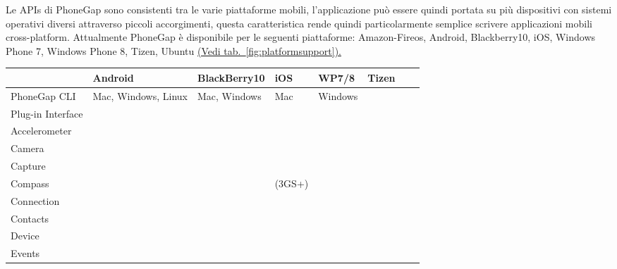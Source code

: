             Le APIs di PhoneGap sono consistenti tra le varie piattaforme mobili,
            l'applicazione può essere quindi portata su più dispositivi con
            sistemi operativi diversi attraverso piccoli accorgimenti, questa
            caratteristica rende quindi particolarmente semplice scrivere
            applicazioni mobili cross-platform.
            Attualmente PhoneGap è disponibile per le seguenti piattaforme:
            Amazon-Fireos, Android, Blackberry10, iOS, Windows Phone 7,
            Windows Phone 8, Tizen, Ubuntu \hyperref[fig:platformsupport]{(Vedi
            tab.~\ref{fig:platformsupport}).}
            {\footnotesize
                \begin{table}
                    \begin{tabularx}{\textwidth}{|l*{7}{|s}|}
                        \hline
                          & Android & Black\-Berry10 & iOS & WP7/8
                        & Tizen
                        \tabularnewline
                        \hline
                        PhoneGap CLI &\sprt{} Mac, Windows, Linux &
                        \sprt{} Mac, Windows & \sprt{} Mac & \sprt{} Windows & \notsprt{}
                        \tabularnewline
                        \hline
                        Plug-in Interface & \sprt{} & \sprt{} & \sprt{} & \sprt{} &
                        \notsprt{}
                        \tabularnewline
                        \hline
                        Accelerometer & \sprt{} & \sprt{} & \sprt{} & \sprt{} & \sprt{}
                        \tabularnewline
                        \hline
                        Camera & \sprt{} & \sprt{} & \sprt{} & \sprt{} & \sprt{}
                        \tabularnewline
                        \hline
                        Capture & \sprt{} & \sprt{} & \sprt{} & \sprt{} & \notsprt{}
                        \tabularnewline
                        \hline
                        Compass & \sprt{} & \sprt{} & \sprt{} (3GS+)& \sprt{} & \sprt{}
                        \tabularnewline
                        \hline
                        Connection & \sprt{} & \sprt{} & \sprt{} & \sprt{} & \sprt{}
                        \tabularnewline
                        \hline
                        Contacts & \sprt{} & \sprt{} & \sprt{} & \sprt{} & \notsprt{}
                        \tabularnewline
                        \hline
                        Device & \sprt{} & \sprt{} & \sprt{} & \sprt{} & \sprt{}
                        \tabularnewline
                        \hline
                        Events & \sprt{} & \sprt{} & \sprt{} & \sprt{} & \sprt{}

\end{tabularx}
\end{table}}
